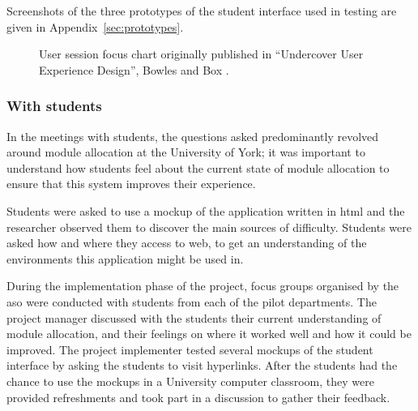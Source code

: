 \documentclass[]{scrartcl}
\begin{document}
Screenshots of the three prototypes of the student interface used in testing
are given in Appendix~\ref{sec:prototypes}.

\begin{figure}
  \begin{center}
  \end{center}
  \caption{User session focus chart originally published in
    ``Undercover User Experience Design'', Bowles and Box \cite{bowles2011undercover}.}
  \label{bowles_dualpurpose_chart}
\end{figure}

\subsubsection{With students}

In the meetings with students, the questions asked predominantly revolved
around module allocation at the University of York; it was important to
understand how students feel about the current state of module allocation to
ensure that this system improves their experience.

Students were asked to use a mockup of the application written in \gls{html}
and the researcher observed them to discover the main sources of difficulty.
Students were asked how and where they access to web, to get an understanding
of the environments this application might be used in.

During the implementation phase of the project, focus groups organised by the
\gls{aso} were conducted with students from each of the pilot departments. The
project manager discussed with the students their current understanding of
module allocation, and their feelings on where it worked well and how it could
be improved. The project implementer tested several mockups of the student
interface by asking the students to visit hyperlinks. After the students had
the chance to use the mockups in a University computer classroom, they were
provided refreshments and took part in a discussion to gather their feedback.
\end{document}
